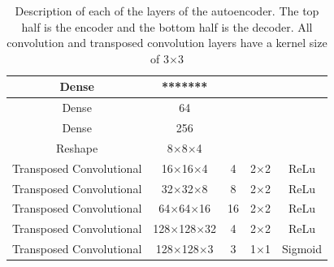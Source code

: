 \documentclass[12pt, onecolumn]{article}
\begin{document}
\begin{table}[H]
\begin{tabular}{|c c c c c|}
                Dense & ******* & & & \\
    
                \hline
    
                Dense & 64 & & & \\
    
                Dense & 256 & & & \\
    
                Reshape & 8$\times$8$\times$4 & & & \\
    
                Transposed Convolutional & 16$\times$16$\times$4 & 4 & 2$\times$2 & ReLu \\
    
                Transposed Convolutional & 32$\times$32$\times$8 & 8 & 2$\times$2 & ReLu \\
    
                Transposed Convolutional & 64$\times$64$\times$16 & 16 & 2$\times$2 & ReLu \\
    
                Transposed Convolutional & 128$\times$128$\times$32 & 4 & 2$\times$2 & ReLu \\
    
                Transposed Convolutional & 128$\times$128$\times$3 & 3 & 1$\times$1 & Sigmoid \\

                \hline

            \end{tabular}
            \caption{Description of each of the layers of the autoencoder. The top half is the encoder and the bottom half is the decoder. All convolution and transposed convolution layers have a kernel size of 3$\times$3}
            \label{autoencoder_layers}
        \end{table}
\end{document}
